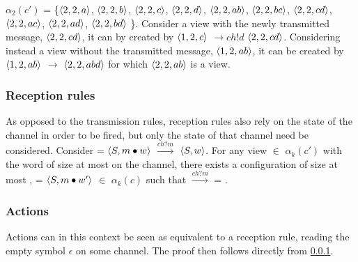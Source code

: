$\alpha_2(c')$ = \{$\langle2,2,a\rangle$, $\langle2,2,b\rangle$, $\langle2,2,c\rangle$, $\langle2,2,d\rangle$, $\langle2,2,ab\rangle$, $\langle2,2,bc\rangle$, $\langle2,2,cd\rangle$, $\langle2,2,ac\rangle$, $\langle2,2,ad\rangle$, $\langle2,2,bd\rangle $ \}. Consider a view with the newly transmitted message, $\langle2,2,cd\rangle$, it can by created by $\langle1,2,c\rangle$ $\rightarrow{ch!d}$ $\langle2,2,cd\rangle$. Considering instead a view without the transmitted message, $\langle1,2,ab\rangle$, it can be created by $\langle1,2,ab\rangle$ $\rightarrow$ $\langle2,2,abd\rangle$ for which $\langle2,2,ab\rangle$ is a view.

\subsubsection{Reception rules}
\label{proofreception}
As opposed to the transmission rules, reception rules also rely on the state of the channel in order to be fired, but only the state of that channel need be considered. Consider  = $\langle S, m\bullet w\rangle$ $\xrightarrow{ch?m}$ $\langle S, w\rangle$. For any view  $\in$ $\alpha_k(c')$ with the word  of size at most  on the channel, there exists a configuration of size at most ,  = $\langle S, m\bullet w'\rangle$ $\in$ $\alpha_k(c)$ such that  $\xrightarrow{ch?m}$  = .

\subsubsection{Actions}
Actions can in this context be seen as equivalent to a reception rule, reading the empty symbol $\epsilon$ on some channel. The proof then follows directly from \ref{proofreception}.

